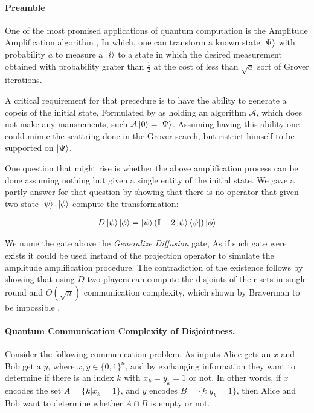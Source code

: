 \documentclass{article}
\begin{document}
\begin{multicols*}{2}

  \paragraph{Preamble} One of the most promised applications of quantum computation is the Amplitude Amplification algorithm \cite{Brassard_2002}, In which, one can transform a known state $\ket{\Psi}$  with probability $a$ to measure a $\ket{i}$ to a state in which the desired measurement obtained with probability grater than $\frac{1}{2}$ at the cost of less than $\sqrt{a}$ sort of Grover iterations.
  
  A critical requirement for that precedure is to have the ability to generate a copeis of the initial state, Formulated by \cite{Brassard_2002} as holding an algorithm $\mathcal{A}$, which does not make any mausrements, such $\mathcal{A}\ket{0}=\ket{\Psi}$. Assuming having this ability one could mimic the scattring done in the Grover search, but ristrict himself to be supported on $\ket{\Psi}$. 


  One question that might rise is whether the above amplification process can be done assuming nothing but given a single entity of the initial state. We gave a partly answer for that question by showing that there is no operator that given two state $\ket{\psi},\ket{\phi}$ compute the transformation: 
 
  
\begin{equation*}
  \begin{split}
    D \ket{\psi}\ket{\phi} = \ket{\psi}\left( \mathbb{I} - 2 \ket{\psi}\bra{\psi} \right)\ket{\phi} 
   \end{split}
\end{equation*}

We name the gate above the \textit{Generalize Diffusion} gate, As if such gate were exists it could be used instand of the projection operator to simulate the amplitude amplification procedure. The contradiction of the existence follows by showing that using $D$ two players can compute the disjoints of their sets in single round and $O\left( \sqrt{n} \right)$ communication complexity, which shown by Braverman to be impossible \cite{Braverman}.    

\paragraph{Quantum Communication Complexity of Disjointness.}
Consider the following communication problem.
As inputs Alice gets an \(x\) and Bob get a \(y\), where \(x, y \in \{0, 1\}^n \), and by exchanging information they want to determine if there is an index \(k\) with \(x_k = y_k = 1 \) or not. 
In other words, if \(x\) encodes the set \(A = \{k | x_k = 1\} \), and \(y\) encodes \(B = \{k | y_k = 1\}\), 
then Alice and Bob want to determine whether \( A \cap B \) is empty or not.


\end{multicols*}
\end{document}
